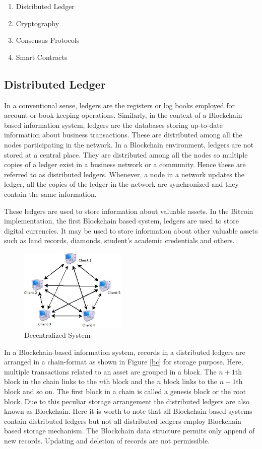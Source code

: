\documentclass[10pt]{IETBook}
\begin{document}
\begin{enumerate}
 \item Distributed Ledger
 \item Cryptography
 \item Consensus Protocols
 \item Smart Contracts
\end{enumerate}

\subsection{Distributed Ledger} 

In a conventional sense, ledgers are the registers or log books employed for account or book-keeping operations. Similarly, in the context of a Blockchain based information system, ledgers are the databases storing up-to-date information about business transactions. These are distributed among all the nodes participating in the network. In a Blockchain environment, ledgers are not stored at a central place. They are distributed among all the nodes so multiple copies of a ledger exist in a business network or a community. Hence these are referred to as distributed ledgers. Whenever, a node in a network updates the ledger, all the copies of the ledger in the network are synchronized and they contain the same information.

These ledgers are used to store information about valuable assets. In the Bitcoin implementation, the first Blockchain based system, ledgers are used to store digital currencies. It may be used to store information about other valuable assets such as land records, diamonds, student's academic credentials and others.

\begin{figure}[h]
	\centering
	\includegraphics[width=2in]{Decentralise}
	\caption{Decentralized System}
\end{figure}

In a Blockchain-based information system, records in a distributed ledgers are arranged in a chain-format as shown in Figure \ref{bc} for storage purpose. Here, multiple transactions related to an asset are grouped in a block. The $n+1$th block in the chain links to the $n$th block and the $n$ block links to the $n-1$th block and so on. The first block in a chain is called a genesis block or the root block. Due to this peculiar storage arrangement the distributed ledgers are also known as Blockchain. Here it is worth to note that all Blockchain-based systems contain distributed ledgers but not all distributed ledgers employ Blockchain based storage mechanism. The Blockchain data structure permits only append of new records. Updating and deletion of records are not permissible.
\end{document}
